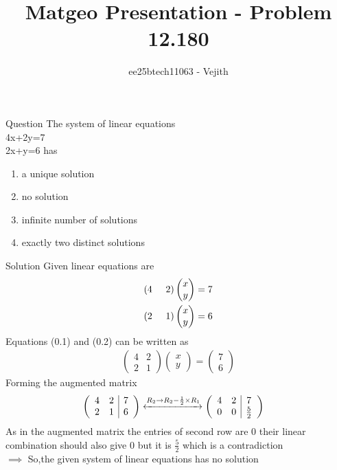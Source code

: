 \documentclass{beamer}
\title{Matgeo Presentation - Problem 12.180}
\author{ee25btech11063 - Vejith}
\numberwithin{equation}{section}
\providecommand{\brak}[1]{\ensuremath{\left(#1\right)}}
\theoremstyle{remark}
\newcommand{\myvec}[1]{\ensuremath{\begin{pmatrix}#1\end{pmatrix}}}
\begin{document}
\frame{\titlepage}
\begin{frame}{Question}
    The system of linear equations\\
\hspace*{3cm}4x+2y=7\\
\hspace*{3cm}2x+y=6  has 
\begin{multicols}{2}
\begin{enumerate}[label=\alph*)]
    \item a  unique solution
    \item no solution
    \item infinite number of solutions
    \item exactly two distinct solutions 
\end{enumerate}
\end{multicols}
\end{frame}

\begin{frame}{Solution}
    Given linear equations are
\begin{align}
    \brak{4\hspace{0.5cm} 2}\myvec{x\\y}=7\\
     \brak{2\hspace{0.5cm} 1}\myvec{x\\y}=6
\end{align}
Equations (0.1) and (0.2) can be written as
\begin{align}
    \begin{pmatrix}
        4 & 2\\
        2 & 1
    \end{pmatrix} \myvec{x\\y}=\myvec{7\\6}
\end{align}
Forming the augmented matrix
\begin{align}
     \left(\begin{array}{cc|c}
        4 & 2 & 7 \\
        2 & 1 & 6 
\end{array}\right) &\xleftrightarrow{R_2 \rightarrow R_2- \frac{1}{2} \times R_1}  \left(\begin{array}{cc|c}
        4 & 2 & 7 \\
        0 & 0 & \frac{5}{2} 
\end{array}\right)
\end{align}
	As in the augmented matrix the entries of second  row are 0 their linear combination should also give 0 but it is $\frac{5}{2}$ which is a contradiction\\
$\implies$ So,the given system of linear equations has no solution
\end{frame}
\end{document}
